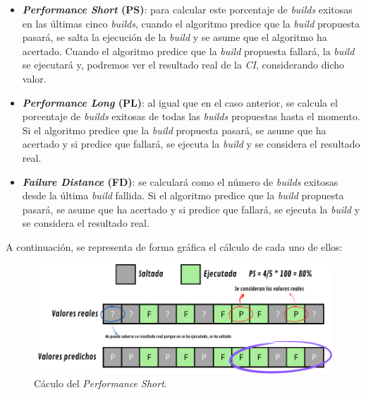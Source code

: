 \begin{itemize}
    \item \textbf{\textit{Performance Short} (PS)}: para calcular este porcentaje de \textit{builds}
    exitosas en las últimas cinco \textit{builds}, cuando el algoritmo predice que la \textit{build}
    propuesta pasará, se salta la ejecución de la \textit{build} y se asume que el algoritmo ha
    acertado. Cuando el algoritmo predice que la \textit{build} propuesta fallará, la \textit{build}
    se ejecutará y, podremos ver el resultado real de la \textit{CI}, considerando dicho valor.\\

    \item \textbf{\textit{Performance Long} (PL)}: al igual que en el caso anterior, se calcula el
    porcentaje de \textit{builds} exitosas de todas las \textit{builds} propuestas hasta el momento.
    Si el algoritmo predice que la \textit{build} propuesta pasará, se asume que ha acertado y si
    predice que fallará, se ejecuta la \textit{build} y se considera el resultado real.\\

    \item \textbf{\textit{Failure Distance} (FD)}: se calculará como el número de \textit{builds}
    exitosas desde la última \textit{build} fallida. Si el algoritmo predice que la \textit{build}
    propuesta pasará, se asume que ha acertado y si predice que fallará, se ejecuta la
    \textit{build} y se considera el resultado real.\\

\end{itemize}

\noindent A continuación, se representa de forma gráfica el cálculo de cada uno de ellos:

\begin{figure}[H]
    \centering
    \includegraphics[scale=0.9]{images/PS.pdf}
    \caption{Cáculo del \textit{Performance Short}.}
    \label{fig:PL}
\end{figure}


